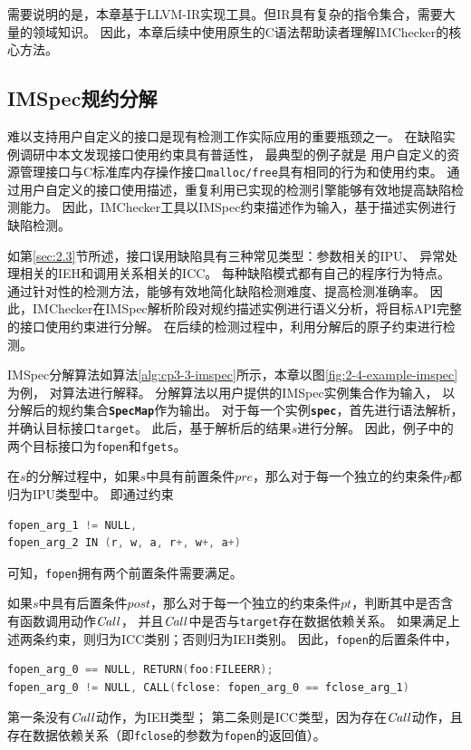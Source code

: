 需要说明的是，本章基于LLVM-IR实现工具。但IR具有复杂的指令集合，需要大量的领域知识。
因此，本章后续中使用原生的C语法帮助读者理解IMChecker的核心方法。

\subsection{IMSpec规约分解}
难以支持用户自定义的接口是现有检测工作实际应用的重要瓶颈之一。
在缺陷实例调研中本文发现接口使用约束具有普适性，
最典型的例子就是
用户自定义的资源管理接口与C标准库内存操作接口\texttt{malloc/free}具有相同的行为和使用约束。
通过用户自定义的接口使用描述，重复利用已实现的检测引擎能够有效地提高缺陷检测能力。
因此，IMChecker工具以IMSpec约束描述作为输入，基于描述实例进行缺陷检测。

如第\ref{sec:2.3}节所述，接口误用缺陷具有三种常见类型：参数相关的IPU、
异常处理相关的IEH和调用关系相关的ICC。
每种缺陷模式都有自己的程序行为特点。
通过针对性的检测方法，能够有效地简化缺陷检测难度、提高检测准确率。
因此，IMChecker在IMSpec解析阶段对规约描述实例进行语义分析，将目标API完整的接口使用约束进行分解。
在后续的检测过程中，利用分解后的原子约束进行检测。



IMSpec分解算法如算法\ref{alg:cp3-3-imspec}所示，本章以图\ref{fig:2-4-example-imspec}为例，
对算法进行解释。
分解算法以用户提供的IMSpec实例集合作为输入，
以分解后的规约集合\textbf{\texttt{SpecMap}}作为输出。
对于每一个实例\textbf{\texttt{spec}}，首先进行语法解析，并确认目标接口\texttt{target}。
此后，基于解析后的结果$s$进行分解。
因此，例子中的两个目标接口为\texttt{fopen}和\texttt{fgets}。

在$s$的分解过程中，如果$s$中具有前置条件$pre$，那么对于每一个独立的约束条件$p$都归为IPU类型中。
即通过约束
\begin{lstlisting}[language={C},
basicstyle=\linespread{0.8}\listingsfont,
numbers=none,
xleftmargin=.25\textwidth]
fopen_arg_1 != NULL,
fopen_arg_2 IN (r, w, a, r+, w+, a+)
\end{lstlisting}
可知，\texttt{fopen}拥有两个前置条件需要满足。

如果$s$中具有后置条件$post$，那么对于每一个独立的约束条件$pt$，判断其中是否含有函数调用动作$\mathit{Call}$，
并且$\mathit{Call}$中是否与\texttt{target}存在数据依赖关系。
如果满足上述两条约束，则归为ICC类别；否则归为IEH类别。
因此，\texttt{fopen}的后置条件中，
\begin{lstlisting}[language={C},
basicstyle=\linespread{0.8}\listingsfont,
numbers=none,
xleftmargin=.15\textwidth]
fopen_arg_0 == NULL, RETURN(foo:FILEERR);
fopen_arg_0 != NULL, CALL(fclose: fopen_arg_0 == fclose_arg_1)
\end{lstlisting}
第一条没有$\mathit{Call}$动作，为IEH类型；
第二条则是ICC类型，因为存在$\mathit{Call}$动作，且存在数据依赖关系（即\texttt{fclose}的参数为\texttt{fopen}的返回值）。

